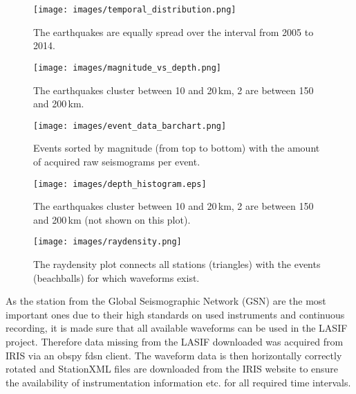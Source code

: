 \begin{figure}[H]
\begin{center}
\texttt{[image: images/temporal\_distribution.png]}
\caption{The earthquakes are equally spread over the interval from 2005 to 2014.}
\label{temp_dist}
\end{center}
\end{figure}

\begin{figure}[H]
\begin{center}
\texttt{[image: images/magnitude\_vs\_depth.png]}
\caption{The earthquakes cluster between 10 and 20\,km, 2 are between 150 and 200\,km.}
\label{depth_scatter}
\end{center}
\end{figure}

\begin{figure}[H]
\begin{center}
\texttt{[image: images/event\_data\_barchart.png]}
\caption{Events sorted by magnitude (from top to bottom) with the amount of acquired raw seismograms per event.}
\label{event_data}
\end{center}
\end{figure}

\begin{figure}[H]
\begin{center}
\texttt{[image: images/depth\_histogram.eps]}
\caption{The earthquakes cluster between 10 and 20\,km, 2 are between 150 and 200\,km (not shown on this plot).}
\label{depth_dist}
\end{center}
\end{figure}

\begin{figure}[H]
\begin{center}
\texttt{[image: images/raydensity.png]}
\caption{The raydensity plot connects all stations (triangles) with the events (beachballs) for which waveforms exist.}
\label{raydens}
\end{center}
\end{figure}

As the station from the Global Seismographic Network (GSN) are the most important ones due to their high standards on used 
instruments and continuous recording, it is made sure that all available waveforms can be used in the LASIF project. 
Therefore data missing from the LASIF downloaded was acquired from IRIS via an obspy fdsn client. 
The waveform data is then horizontally correctly rotated and StationXML files are downloaded from the IRIS website to
ensure the availability of instrumentation information etc. for all required time intervals. \\

